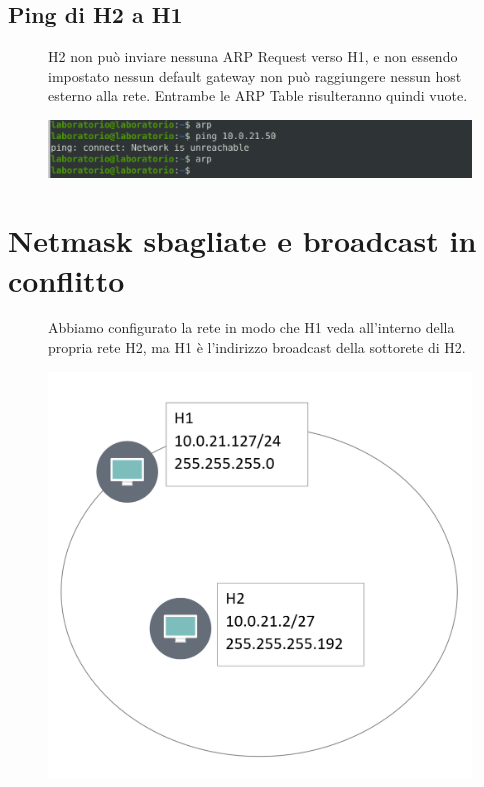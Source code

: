 \documentclass{article}
\begin{document}
\subsection{Ping di H2 a H1}
\begin{figure}[!htb]
    \begin{minipage}{0.55\textwidth}
      H2 non può inviare nessuna ARP Request verso H1, e non essendo impostato nessun default gateway non può raggiungere nessun host esterno alla rete.
      Entrambe le ARP Table risulteranno quindi vuote.
    \end{minipage}\hfill
    \begin{minipage}{0.4\textwidth}
      \centering
      \includegraphics[width=1\linewidth]{es3NetworkUnreach.png}
    \end{minipage}
 \end{figure}
 \pagebreak
\section{Netmask sbagliate e broadcast in conflitto}
\begin{figure}[!htb]
    \begin{minipage}{0.48\textwidth}
    Abbiamo configurato la rete in modo che H1 veda all’interno della propria rete H2, ma H1 è l’indirizzo broadcast della sottorete di H2.
    \end{minipage}\hfill
    \begin{minipage}{0.48\textwidth}
      \centering
      \includegraphics[width=0.7\linewidth]{es4.png}
    \end{minipage}
 \end{figure}
\end{document}
